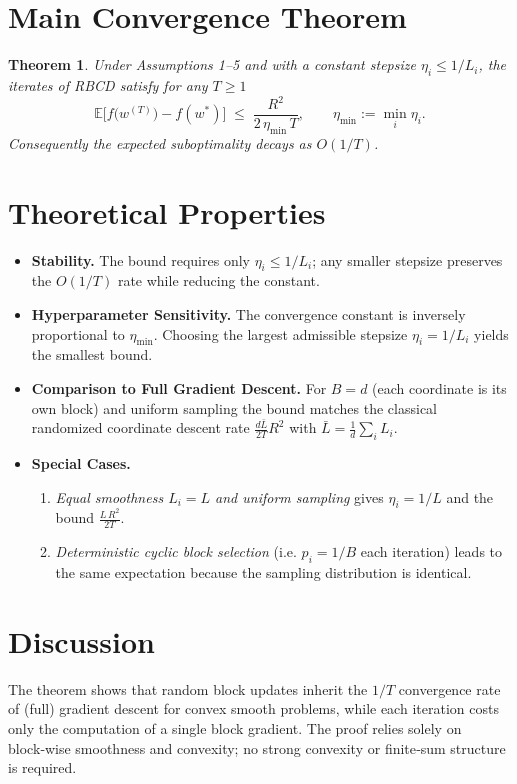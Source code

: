 \documentclass{article}
\newtheorem{theorem}{Theorem}
\newcommand{\E}{\mathbb{E}}
\begin{document}
\section*{Main Convergence Theorem}
\begin{theorem}\label{thm:main}
Under Assumptions 1–5 and with a constant stepsize
$\eta_i\le 1/L_i$, the iterates of RBCD satisfy for any $T\ge1$
\[
\E\!\big[f\!\big(w^{(T)}\big)-f(w^{*})\big]
\;\le\;
\frac{R^{2}}{2\,\eta_{\min}\,T},
\qquad 
\eta_{\min}:=\min_{i}\eta_i .
\]
Consequently the expected suboptimality decays as $O(1/T)$.
\end{theorem}

\section*{Theoretical Properties}
\begin{itemize}
\item \textbf{Stability.} The bound requires only $\eta_i\le1/L_i$; any
smaller stepsize preserves the $O(1/T)$ rate while reducing the constant.
\item \textbf{Hyperparameter Sensitivity.} The convergence constant is inversely
proportional to $\eta_{\min}$. Choosing the largest admissible stepsize
$\eta_i=1/L_i$ yields the smallest bound.
\item \textbf{Comparison to Full Gradient Descent.} For $B=d$ (each coordinate
is its own block) and uniform sampling the bound matches the classical
randomized coordinate descent rate $\frac{d\bar L}{2T}R^{2}$ with
$\bar L=\frac{1}{d}\sum_i L_i$.
\item \textbf{Special Cases.}
\begin{enumerate}[label=(\alph*)]
\item \emph{Equal smoothness $L_i=L$ and uniform sampling} gives
$\eta_i=1/L$ and the bound $\frac{L\,R^{2}}{2T}$.
\item \emph{Deterministic cyclic block selection} (i.e. $p_i=1/B$ each
iteration) leads to the same expectation because the sampling distribution
is identical.
\end{enumerate}
\end{itemize}

\section*{Discussion}
The theorem shows that random block updates inherit the $1/T$ convergence
rate of (full) gradient descent for convex smooth problems, while each
iteration costs only the computation of a single block gradient.  The proof
relies solely on block‑wise smoothness and convexity; no strong convexity or
finite‑sum structure is required.
\end{document}
